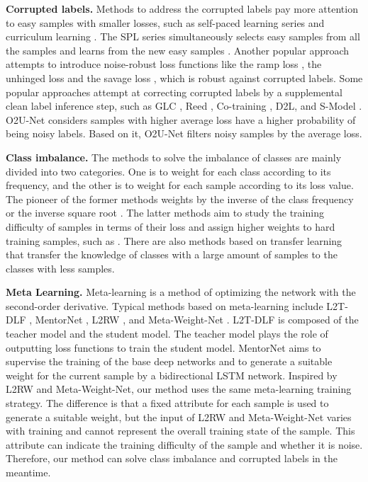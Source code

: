 \documentclass[letterpaper]{article} %
\newcommand{\bd}[1]{\textbf{#1}}
\begin{document}
\noindent\bd{Corrupted labels.}
Methods to address the corrupted labels pay more attention to easy samples with smaller losses, such as self-paced learning series \cite{kumar2010self,jiang2014easy,jiang2014self} and curriculum learning \cite{bengio2009curriculum}.
The SPL series simultaneously selects easy samples from all the samples and learns from the new easy samples \cite{pi2016self}.
Another popular approach attempts to introduce noise-robust loss functions like the ramp loss \cite{brooks2011support}, the unhinged loss \cite{van2015learning} and the savage loss \cite{masnadi2008design}, which is robust against corrupted labels.
Some popular approaches attempt at correcting corrupted labels by a supplemental clean label inference step, such as GLC \cite{hendrycks2018using}, Reed \cite{reed2014training}, Co-training \cite{han2018co}, D2L\cite{ma2018dimensionality}, and S-Model \cite{goldberger2016training}.
O2U-Net \cite{huang2019o2u} considers samples with higher average loss have a higher probability of being noisy labels.
Based on it, O2U-Net filters noisy samples by the average loss.


\noindent\bd{Class imbalance.}
The methods to solve the imbalance of classes are mainly divided into two categories.
One is to weight for each class according to its frequency, and the other is to weight for each sample according to its loss value. 
The pioneer of the former methods weights by the inverse of the class frequency \cite{huang2016learning,wang2017learning} or the inverse square root \cite{mahajan2018exploring,mikolov2013distributed}.
The latter methods aim to study the training difficulty of  samples in terms of their loss and assign higher weights to hard training samples, such as \cite{freund1997decision,lin2017focal,malisiewicz2011ensemble,dong2017class}.
There are also methods based on transfer learning \cite{wang2017learning,cui2018large} that transfer the knowledge of classes with a large amount of samples to the classes with less samples.

\noindent\bd{Meta Learning.}
Meta-learning \cite{finn2017model,antoniou2018train,li2017meta,shu2018small,ravi2016optimization} is a method of optimizing the network with the second-order derivative.
Typical methods based on meta-learning include L2T-DLF \cite{wu2018learning}, MentorNet \cite{jiang2018mentornet}, L2RW \cite{ren2018learning}, and Meta-Weight-Net \cite{shu2019meta}.
L2T-DLF is composed of the teacher model and the student model.
The teacher model plays the role of outputting loss functions to train the student model.
MentorNet aims to supervise the training of the base deep networks and to generate a suitable weight for the current sample by a bidirectional LSTM network.
Inspired by L2RW and Meta-Weight-Net, our method uses the same meta-learning training strategy.
The difference is that a fixed attribute for each sample is used to generate a suitable weight, but the input of L2RW and Meta-Weight-Net varies with training and cannot represent the overall training state of the sample. 
This attribute can indicate the training difficulty of the sample and whether it is noise. 
Therefore, our method can solve class imbalance and corrupted labels in the meantime.
\end{document}
